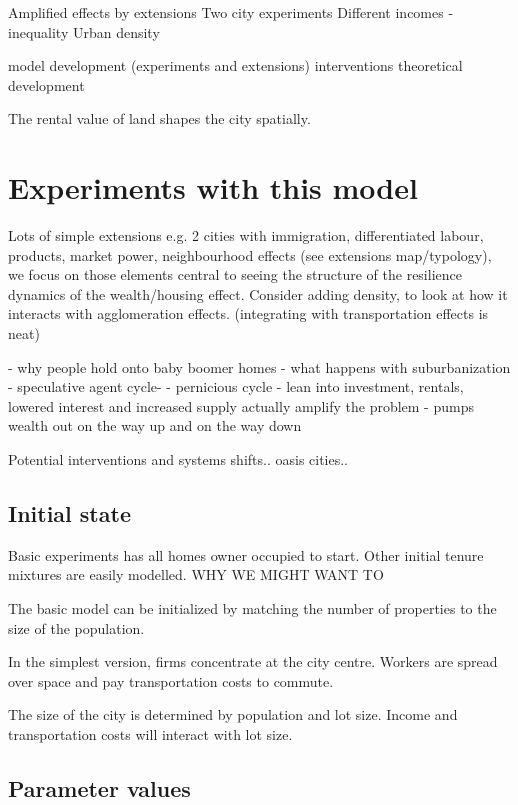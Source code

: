 Amplified effects by extensions
Two city experiments
Different incomes  - inequality
Urban density



model development (experiments and extensions)
interventions
theoretical development

The rental value of land shapes the city spatially.  

\section{Experiments with this model}
Lots of simple extensions e.g. 2 cities with immigration, differentiated labour, products, market power, neighbourhood effects (see extensions map/typology), we focus on those elements central to seeing the structure of the resilience dynamics of the wealth/housing effect. Consider adding density, to look at how it interacts with agglomeration effects. (integrating with transportation effects is neat)


- why people hold onto baby boomer homes
- what happens with suburbanization
- speculative agent cycle- 
- pernicious cycle - lean into investment, rentals, lowered interest and increased supply actually amplify the problem
- pumps wealth out on the way up and on the way down


Potential interventions and systems shifts.. oasis cities..





\subsection{Initial state}
Basic experiments has all homes owner occupied to start. Other initial tenure mixtures are easily modelled. WHY WE MIGHT WANT TO

The basic model can be initialized by matching the number of properties to the size of the population. 

In the simplest version, firms concentrate at the city centre. Workers are spread over space and pay transportation costs to commute.

The size of the city is determined by population and lot size. Income and transportation costs will interact with lot size. 

\subsection{Parameter values}


